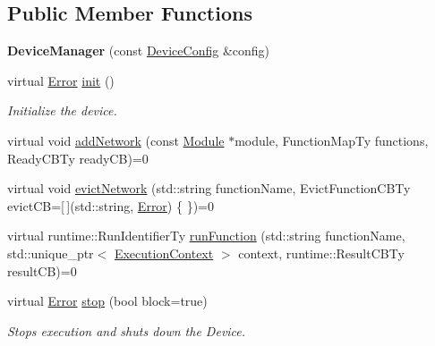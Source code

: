 \subsection*{Public Member Functions}
\begin{DoxyCompactItemize}
\item 
\mbox{\label{classglow_1_1runtime_1_1_device_manager_abbfb4fb1458c6725d304cd581e247cbf}} 
{\bfseries Device\+Manager} (const \hyperlink{structglow_1_1runtime_1_1_device_config}{Device\+Config} \&config)
\item 
\mbox{\label{classglow_1_1runtime_1_1_device_manager_a5adbd25b00686c38947ea6380e03e574}} 
virtual \hyperlink{namespaceglow_afdb176c3a672ef66db0ecfc19a8d39bf}{Error} \hyperlink{classglow_1_1runtime_1_1_device_manager_a5adbd25b00686c38947ea6380e03e574}{init} ()
\begin{DoxyCompactList}\small\item\em Initialize the device. \end{DoxyCompactList}\item 
virtual void \hyperlink{classglow_1_1runtime_1_1_device_manager_a9bbf9a88f8bf9ddc0ce63590580aa91f}{add\+Network} (const \hyperlink{classglow_1_1_module}{Module} $\ast$module, Function\+Map\+Ty functions, Ready\+C\+B\+Ty ready\+CB)=0
\item 
virtual void \hyperlink{classglow_1_1runtime_1_1_device_manager_a147c76a007db17659c1962c1fa864f9a}{evict\+Network} (std\+::string function\+Name, Evict\+Function\+C\+B\+Ty evict\+CB=\mbox{[}$\,$\mbox{]}(std\+::string, \hyperlink{namespaceglow_afdb176c3a672ef66db0ecfc19a8d39bf}{Error}) \{ \})=0
\item 
virtual runtime\+::\+Run\+Identifier\+Ty \hyperlink{classglow_1_1runtime_1_1_device_manager_ac182cdf6ed9f6903c11fa71c0446d1f7}{run\+Function} (std\+::string function\+Name, std\+::unique\+\_\+ptr$<$ \hyperlink{classglow_1_1_execution_context}{Execution\+Context} $>$ context, runtime\+::\+Result\+C\+B\+Ty result\+CB)=0
\item 
\mbox{\label{classglow_1_1runtime_1_1_device_manager_a0f32d3a9c8f72962febe2d7b284486ba}} 
virtual \hyperlink{namespaceglow_afdb176c3a672ef66db0ecfc19a8d39bf}{Error} \hyperlink{classglow_1_1runtime_1_1_device_manager_a0f32d3a9c8f72962febe2d7b284486ba}{stop} (bool block=true)
\begin{DoxyCompactList}\small\item\em Stops execution and shuts down the Device. \end{DoxyCompactList}\item 

\end{DoxyCompactItemize}
